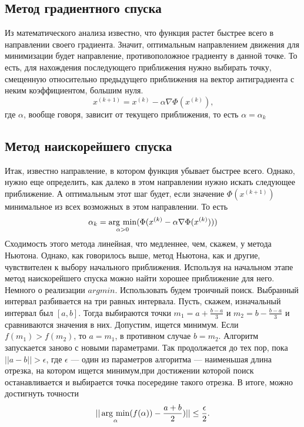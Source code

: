 \documentclass[a4paper, 12pt]{article}
\newcommand{\argmin}{\mathop{\rm arg~min}\limits}
\begin{document}
\subsection*{Метод градиентного спуска}
Из математического анализа известно, что функция растет быстрее всего в направлении
своего градиента. Значит, оптимальным направлением движения для минимизации будет направление, 
противоположное градиенту в данной точке. То есть, 
для нахождения последующего приближения нужно выбирать точку, смещенную относительно предыдущего
приближения на вектор антиградиента с неким коэффициентом, большим нуля.
\begin{equation}
	x^{(k+1)} = x^{(k)} - \alpha \nabla \Phi(x^{(k)}) \text{,}
\end{equation}
где $\alpha$, вообще говоря, зависит от текущего приближения, то есть $\alpha = \alpha_k$
\subsection*{Метод наискорейшего спуска}
Итак, известно направление, в котором функция убывает быстрее всего. Однако, нужно
еще определить, как далеко в этом направлении нужно искать следующее приближение.
А оптимальным этот шаг будет, если значение $\Phi(x^{(k+1)})$ минимальное из всех возможных в этом направлении.
То есть 
\begin{equation}
	\alpha_k = \argmin_{\alpha > 0} (\Phi(x^{(k)} - \alpha \nabla \Phi(x^{(k)})))
\end{equation}
Сходимость этого метода линейная, что медленнее, чем, скажем, у метода Ньютона. Однако, как
говорилось выше, метод Ньютона, как и другие, чувствителен к выбору начального приближения.
Используя на начальном этапе метод наискорейшего спуска можно найти хорошее приближение для него.\\
Немного о реализации $argmin$. Использовать будем троичный поиск. Выбранный интервал разбивается на три равных интервала.
Пусть, скажем, изначальный интервал был $[a,b]$. Тогда выбираются точки $m_1 = a+\frac{b-a}{3}$ и $m_2 = b-\frac{b-a}{3}$ и сравниваются значения в них.
Допустим, ищется минимум. Если $f(m_1) > f(m_2)$, то $a = m_1$, в противном случае $b = m_2$. Алгоритм запускается заново с новыми параметрами.
Так продолжается до тех пор, пока $||a - b|| > \epsilon$, где $\epsilon$ --- один из параметров алгоритма --- наименьшая длина отрезка, на котором ищется минимум,при достижении которой поиск останавливается и выбирается точка посередине такого отрезка. В итоге, можно достигнуть точности
\begin{equation*}
	||\argmin_{\alpha}(f(\alpha)) - \frac{a+b}{2})|| \leq \frac{\epsilon}{2}.
\end{equation*}
\end{document}
